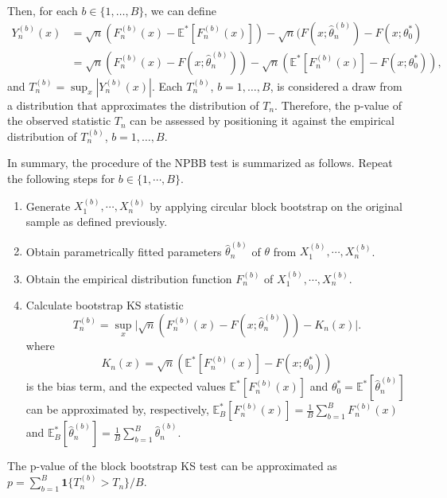 \documentclass[12pt]{article}
\begin{document}
Then, for each $b \in \{1, \dots, B\}$, we can define
\begin{align*}
  Y^{(b)}_n(x) &= \sqrt{n}(F^{(b)}_n(x) - \mathbb{E}^{*}[F^{(b)}_n(x)]) -
             \sqrt{n}(F(x; \hat\theta^{(b)}_n) - F(x; \theta_0^*) \\
           &= \sqrt{n}(F^{(b)}_n(x) - F(x; \hat\theta^{(b)}_n)) -
             \sqrt{n}(\mathbb{E}^{*}[F^{(b)}_n(x)] - F(x; \theta_0^*)),
\end{align*}
and $T^{(b)}_n = \sup_x|Y^{(b)}_n(x)|$. Each $T_n^{(b)}$,
$b =1, \ldots, B$, is considered a draw from a distribution that approximates
the distribution of $T_n$. Therefore, the p-value of the observed statistic
$T_n$ can be assessed by positioning it against the empirical distribution of
$T_n^{(b)}$, $b = 1, \ldots, B$.


In summary, the procedure of the NPBB test is
summarized as follows. Repeat the following steps for $b \in \{1,  \cdots , B\}$.
\begin{enumerate}
\item
  Generate $X^{(b)}_1, \cdots ,X^{(b)}_n$ by applying circular block bootstrap
  on the original sample as
  defined previously.
\item
  Obtain parametrically fitted parameters
  $\hat\theta^{(b)}_n$ of $\theta$ from $X^{(b)}_1, \cdots ,X^{(b)}_n$.
\item
  Obtain the empirical distribution function $F^{(b)}_n$ of
  $X^{(b)}_1, \cdots ,X^{(b)}_n$.
\item
  Calculate bootstrap KS statistic
  \[
    T^{(b)}_n = \sup_x \Big\vert \sqrt{n}\left(F^{(b)}_n(x)
    - F(x; \hat\theta^{(b)}_n)\right) - K_n(x) \Big\vert.
  \]
  where
  \[
    K_{n}(x) = \sqrt{n}(\mathbb{E}^{*}[F^{(b)}_n(x)] -
    F(x; \theta_0^*))
  \]
  is the bias term, and
  the expected values $\mathbb{E}^{*}[F^{(b)}_n(x)]$ and
$\theta_0^* = \mathbb{E}^{*}[\hat\theta^{(b)}_n]$ can be
approximated by, respectively,
$\mathbb{E}_B^{*}[F^{(b)}_n(x)] = \frac{1}{B}\sum_{b = 1}^B F^{(b)}_n(x)$ and
$\mathbb{E}_B^{*}[\hat\theta^{(b)}_n]  =  \frac{1}{B}\sum_{b = 1}^B\hat\theta^{(b)}_n$.
\end{enumerate}
The p-value of the block bootstrap KS test can be approximated
as $p = \sum_{b=1}^B \mathbf{1}\{T^{(b)}_n > T_n\} / B$.
\end{document}
